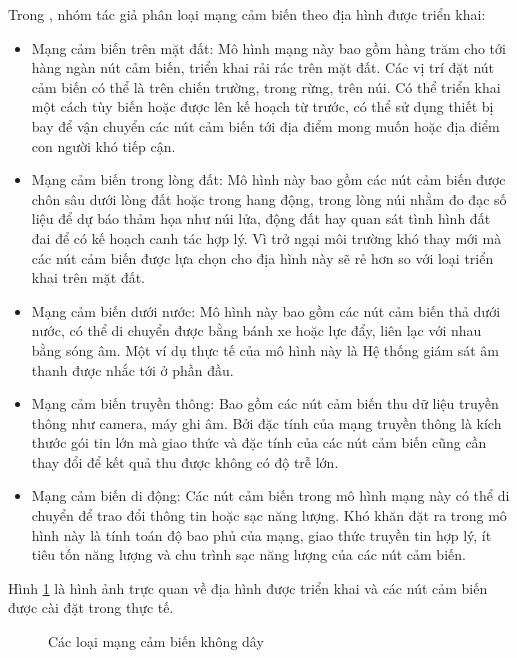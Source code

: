 \documentclass{hust}
\begin{document}
Trong \cite{koviwireless}, nhóm tác giả phân loại mạng cảm biến theo địa hình được triển khai:
\begin{itemize}
	\item Mạng cảm biến trên mặt đất: Mô hình mạng này bao gồm hàng trăm cho tới hàng ngàn nút cảm biến, triển khai rải rác trên mặt đất. Các vị trí đặt nút cảm biến có thể là trên chiến trường, trong rừng, trên núi. Có thể triển khai một cách tùy biến hoặc được lên kế hoạch từ trước, có thể sử dụng thiết bị bay để vận chuyển các nút cảm biến tới địa điểm mong muốn hoặc địa điểm con người khó tiếp cận.
	\item Mạng cảm biến trong lòng đất: Mô hình này bao gồm các nút cảm biến được chôn sâu dưới lòng đất hoặc trong hang động, trong lòng núi nhằm đo đạc số liệu để dự báo thảm họa như núi lửa, động đất hay quan sát tình hình đất đai để có kế hoạch canh tác hợp lý. Vì trở ngại môi trường khó thay mới mà các nút cảm biến được lựa chọn cho địa hình này sẽ rẻ hơn so với loại triển khai trên mặt đất. 
	\item Mạng cảm biến dưới nước: Mô hình này bao gồm các nút cảm biến thả dưới nước, có thể di chuyển được bằng bánh xe hoặc lực đẩy, liên lạc với nhau bằng sóng âm. Một ví dụ thực tế của mô hình này là Hệ thống giám sát âm thanh được nhắc tới ở phần đầu.
	\item Mạng cảm biến truyền thông: Bao gồm các nút cảm biến thu dữ liệu truyền thông như camera, máy ghi âm. Bởi đặc tính của mạng truyền thông là kích thước gói tin lớn mà giao thức và đặc tính của các nút cảm biến cũng cần thay đổi để kết quả thu được không có độ trễ lớn. 
	\item Mạng cảm biến di động: Các nút cảm biến trong mô hình mạng này có thể di chuyển để trao đổi thông tin hoặc sạc năng lượng. Khó khăn đặt ra trong mô hình này là tính toán độ bao phủ của mạng, giao thức truyền tin hợp lý, ít tiêu tốn năng lượng và chu trình sạc năng lượng của các nút cảm biến.
\end{itemize}

Hình \ref{fig:wsn-types} là hình ảnh trực quan về địa hình được triển khai và các nút cảm biến được cài đặt trong thực tế.

\begin{figure}[htb]
	\caption{Các loại mạng cảm biến không dây}\label{fig:wsn-types}
\end{figure}
\end{document}
